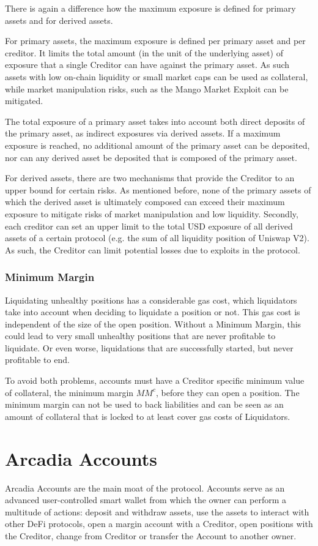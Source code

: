 \documentclass[sigconf,nonacm]{acmart}
\begin{document}
There is again a difference how the maximum exposure is defined for primary assets and for derived assets.

For primary assets, the maximum exposure is defined per primary asset and per creditor.
It limits the total amount (in the unit of the underlying asset) of exposure that a single Creditor can have against the primary asset.
As such assets with low on-chain liquidity or small market caps can be used as collateral,
while market manipulation risks, such as the Mango Market Exploit\cite{coindeskDeFiExchange} can be mitigated.

The total exposure of a primary asset takes into account both direct deposits of the primary asset, as indirect exposures via derived assets.
If a maximum exposure is reached, no additional amount of the primary asset can be deposited, nor can any derived asset be deposited that is composed of the primary asset.

For derived assets, there are two mechanisms that provide the Creditor to an upper bound for certain risks.
As mentioned before, none of the primary assets of which the derived asset is ultimately composed can exceed their maximum exposure to mitigate risks of market manipulation and low liquidity.
Secondly, each creditor can set an upper limit to the total USD exposure of all derived assets of a certain protocol (e.g. the sum of all liquidity position of Uniswap V2).
As such, the Creditor can limit potential losses due to exploits in the protocol.

\subsubsection{Minimum Margin}
Liquidating unhealthy positions has a considerable gas cost, which liquidators take into account when deciding to liquidate a position or not.
This gas cost is independent of the size of the open position.
Without a Minimum Margin, this could lead to very small unhealthy positions that are never profitable to liquidate.
Or even worse, liquidations that are successfully started, but never profitable to end.

To avoid both problems, accounts must have a Creditor specific minimum value of collateral, the minimum margin $MM^{c}$, before they can open a position.
The minimum margin can not be used to back liabilities and can be seen as an amount of collateral that is locked to at least cover gas costs of Liquidators.

\section{Arcadia Accounts}
\label{sec:arcadia-accounts}
Arcadia Accounts are the main moat of the protocol.
Accounts serve as an advanced user-controlled smart wallet from which the owner can perform a multitude of actions: deposit and withdraw assets,
use the assets to interact with other DeFi protocols, open a margin account with a Creditor, open positions with the Creditor,
change from Creditor or transfer the Account to another owner.
\end{document}
